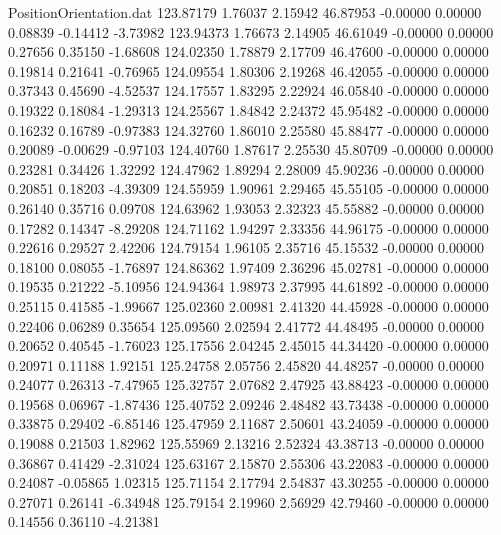 \begin{filecontents}{PositionOrientation.dat}
 123.87179    1.76037    2.15942    46.87953   -0.00000    0.00000    0.08839   -0.14412   -3.73982
 123.94373    1.76673    2.14905    46.61049   -0.00000    0.00000    0.27656    0.35150   -1.68608
 124.02350    1.78879    2.17709    46.47600   -0.00000    0.00000    0.19814    0.21641   -0.76965
 124.09554    1.80306    2.19268    46.42055   -0.00000    0.00000    0.37343    0.45690   -4.52537
 124.17557    1.83295    2.22924    46.05840   -0.00000    0.00000    0.19322    0.18084   -1.29313
 124.25567    1.84842    2.24372    45.95482   -0.00000    0.00000    0.16232    0.16789   -0.97383
 124.32760    1.86010    2.25580    45.88477   -0.00000    0.00000    0.20089   -0.00629   -0.97103
 124.40760    1.87617    2.25530    45.80709   -0.00000    0.00000    0.23281    0.34426    1.32292
 124.47962    1.89294    2.28009    45.90236   -0.00000    0.00000    0.20851    0.18203   -4.39309
 124.55959    1.90961    2.29465    45.55105   -0.00000    0.00000    0.26140    0.35716    0.09708
 124.63962    1.93053    2.32323    45.55882   -0.00000    0.00000    0.17282    0.14347   -8.29208
 124.71162    1.94297    2.33356    44.96175   -0.00000    0.00000    0.22616    0.29527    2.42206
 124.79154    1.96105    2.35716    45.15532   -0.00000    0.00000    0.18100    0.08055   -1.76897
 124.86362    1.97409    2.36296    45.02781   -0.00000    0.00000    0.19535    0.21222   -5.10956
 124.94364    1.98973    2.37995    44.61892   -0.00000    0.00000    0.25115    0.41585   -1.99667
 125.02360    2.00981    2.41320    44.45928   -0.00000    0.00000    0.22406    0.06289    0.35654
 125.09560    2.02594    2.41772    44.48495   -0.00000    0.00000    0.20652    0.40545   -1.76023
 125.17556    2.04245    2.45015    44.34420   -0.00000    0.00000    0.20971    0.11188    1.92151
 125.24758    2.05756    2.45820    44.48257   -0.00000    0.00000    0.24077    0.26313   -7.47965
 125.32757    2.07682    2.47925    43.88423   -0.00000    0.00000    0.19568    0.06967   -1.87436
 125.40752    2.09246    2.48482    43.73438   -0.00000    0.00000    0.33875    0.29402   -6.85146
 125.47959    2.11687    2.50601    43.24059   -0.00000    0.00000    0.19088    0.21503    1.82962
 125.55969    2.13216    2.52324    43.38713   -0.00000    0.00000    0.36867    0.41429   -2.31024
 125.63167    2.15870    2.55306    43.22083   -0.00000    0.00000    0.24087   -0.05865    1.02315
 125.71154    2.17794    2.54837    43.30255   -0.00000    0.00000    0.27071    0.26141   -6.34948
 125.79154    2.19960    2.56929    42.79460   -0.00000    0.00000    0.14556    0.36110   -4.21381

\end{filecontents}
